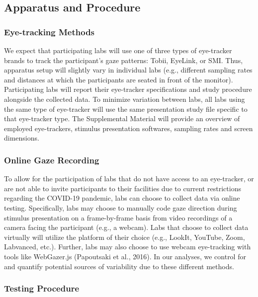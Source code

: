 \documentclass[
  english,
  man,floatsintext]{apa6}
\begin{document}
\hypertarget{apparatus-and-procedure}{%
\subsection{Apparatus and Procedure}\label{apparatus-and-procedure}}

\hypertarget{eye-tracking-methods}{%
\subsubsection{Eye-tracking Methods}\label{eye-tracking-methods}}

We expect that participating labs will use one of three types of eye-tracker brands to track the participant's gaze patterns: Tobii, EyeLink, or SMI. Thus, apparatus setup will slightly vary in individual labs (e.g., different sampling rates and distances at which the participants are seated in front of the monitor). Participating labs will report their eye-tracker specifications and study procedure alongside the collected data. To minimize variation between labs, all labs using the same type of eye-tracker will use the same presentation study file specific to that eye-tracker type. The Supplemental Material will provide an overview of employed eye-trackers, stimulus presentation softwares, sampling rates and screen dimensions.

\hypertarget{online-gaze-recording}{%
\subsubsection{Online Gaze Recording}\label{online-gaze-recording}}

To allow for the participation of labs that do not have access to an eye-tracker, or are not able to invite participants to their facilities due to current restrictions regarding the COVID-19 pandemic, labs can choose to collect data via online testing. Specifically, labs may choose to manually code gaze direction during stimulus presentation on a frame-by-frame basis from video recordings of a camera facing the participant (e.g., a webcam). Labs that choose to collect data virtually will utilize the platform of their choice (e.g., LookIt, YouTube, Zoom, Labvanced, etc.). Further, labs may also choose to use webcam eye-tracking with tools like WebGazer.js (Papoutsaki et al., 2016). In our analyses, we control for and quantify potential sources of variability due to these different methods.

\hypertarget{testing-procedure}{%
\subsubsection{Testing Procedure}\label{testing-procedure}}
\end{document}
